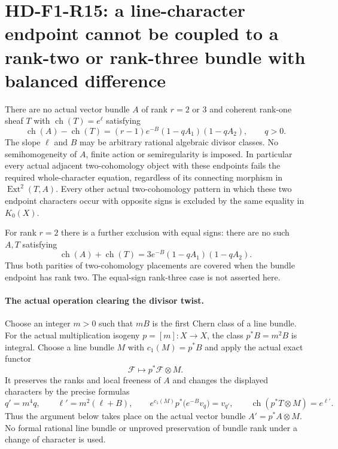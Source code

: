 \section{HD-F1-R15: a line-character endpoint cannot be coupled to a rank-two or rank-three bundle with balanced difference}
\label{sec:followup-rm-low-rank-adjacent}

There are no actual vector bundle $A$ of rank $r=2$ or $3$
and coherent rank-one sheaf $T$ with
$\operatorname{ch}(T)=e^{\ell}$ satisfying
\[
 \operatorname{ch}(A)-\operatorname{ch}(T)
        =(r-1)e^{-B}(1-qA_1)(1-qA_2),\qquad q>0.
 \tag{F1R15.1}
\]
The slope $\ell$ and $B$ may be arbitrary rational algebraic
divisor classes. No semihomogeneity of $A$, finite action
or semiregularity is imposed. In particular every actual
adjacent two-cohomology object with these endpoints fails
the required whole-character equation, regardless of its
connecting morphism in $\operatorname{Ext}^2(T,A)$.
Every other actual two-cohomology pattern in which these
two endpoint characters occur with opposite signs is
excluded by the same equality in $K_0(X)$.

For rank $r=2$ there is a further exclusion with equal
signs: there are no such $A,T$ satisfying
\[
 \operatorname{ch}(A)+\operatorname{ch}(T)
                       =3e^{-B}(1-qA_1)(1-qA_2).
 \tag{F1R15.2}
\]
Thus both parities of two-cohomology placements are covered
when the bundle endpoint has rank two. The equal-sign
rank-three case is not asserted here.

\paragraph{The actual operation clearing the divisor twist.}
Choose an integer $m>0$ such that $mB$ is the first Chern
class of a line bundle. For the actual multiplication
isogeny $p=[m]:X\to X$, the class $p^*B=m^2B$ is integral.
Choose a line bundle $M$ with $c_1(M)=p^*B$ and apply the
actual exact functor
\[
                         \mathcal F\longmapsto p^*\mathcal F\otimes M.
 \tag{F1R15.3}
\]
It preserves the ranks and local freeness of $A$ and
changes the displayed characters by the precise formulas
\[
 q'=m^4q,\qquad \ell'=m^2(\ell+B),\qquad
 e^{c_1(M)}p^*\bigl(e^{-B}v_q\bigr)=v_{q'},\qquad
 \operatorname{ch}(p^*T\otimes M)=e^{\ell'}.
 \tag{F1R15.4}
\]
Thus the argument below takes place on the actual vector
bundle $A'=p^*A\otimes M$. No formal rational line bundle
or unproved preservation of bundle rank under a change
of character is used.

